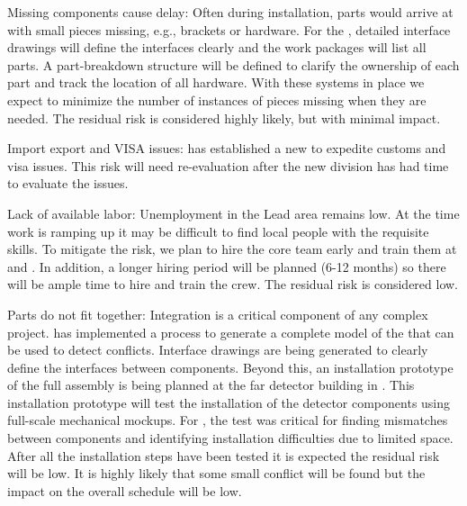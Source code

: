 Missing components cause delay:
Often during  installation, parts would arrive at  with small pieces  missing, e.g., brackets or hardware. For the , detailed interface drawings will %
define the interfaces clearly and the work packages will %
list all parts. A part-breakdown structure will be defined to clarify %
the ownership of each part %
and track the location of all hardware. %
With these systems in place we expect to minimize the number of instances %
of pieces missing when they are needed. %
The residual risk is considered  highly likely, but with minimal impact.

Import export and VISA issues:
 has established a new  to expedite customs and visa issues. This risk will need re-evaluation after the new division has had time to evaluate the issues.

Lack of available labor:
Unemployment in the Lead area remains low. At the time work is ramping up it may be difficult to find local people with the requisite skills. To mitigate the risk, we plan to hire the core team early and train them at  and .  
In addition, a longer hiring period will be planned (6-12 months) so there will be ample time to hire and train the crew. 
The residual risk is considered low.

Parts do not fit together:
Integration is a critical component of any complex project.  has implemented a process to generate a complete \threed model of the  that can be used to detect conflicts. Interface drawings are being generated to clearly define the interfaces between components. Beyond this, an installation prototype of the full assembly is being planned at the  far detector building in . This installation prototype will test the installation of the detector components using full-scale mechanical mockups. For , the  test was critical for finding mismatches between components and identifying installation difficulties %
due to limited space. After all the installation steps have been tested it is expected the residual risk will be low. It is highly likely that some small conflict will be found but the impact on the overall schedule will be low.


